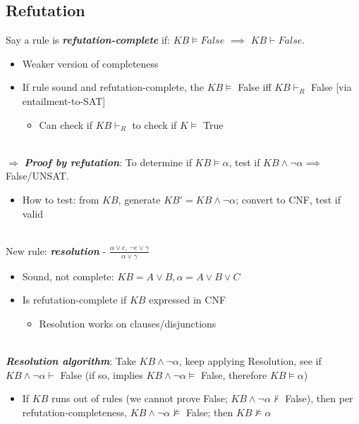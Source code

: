 \documentclass[12pt]{extarticle}
\theoremstyle{definition}
\theoremstyle{remark}
\newcommand{\pstart}[0]{\noindent}
\newcommand{\newp}[0]{~\\ \pstart}
\newcommand{\term}[1]{\noindent\textbf{\textit{#1}}}
\begin{document}
\subsection{Refutation}
Say a rule is \term{refutation-complete} if: $KB\models False$ $\implies$ $KB\vdash False$. \begin{itemize}
    \item Weaker version of completeness
    \item If rule sound and refutation-complete, the $KB\models$ False iff $KB\vdash_R$ False [via entailment-to-SAT] \begin{itemize}
        \item Can check if $KB\vdash_R$ to check if $K\models$ True
    \end{itemize}
\end{itemize}

\newp
$\Rightarrow$ \term{Proof by refutation}: To determine if $KB\models\alpha$, test if $KB\land\neg\alpha\implies$ False/UNSAT.\begin{itemize}
    \item How to test: from $KB$, generate $KB'=KB\land\neg\alpha$; convert to CNF, test if valid
\end{itemize}

\newp
New rule: \term{resolution} - $\frac{\alpha\lor e,\,\neg e\lor\gamma}{\alpha\lor\gamma}$ \begin{itemize}
    \item Sound, not complete: $KB= A\lor B,\alpha=A\lor B\lor C$
    \item Is refutation-complete if $KB$ expressed in CNF \begin{itemize}
        \item Resolution works on clauses/disjunctions
    \end{itemize}
\end{itemize}

\newp
\term{Resolution algorithm}: Take $KB\land\neg\alpha$, keep applying Resolution, see if $KB\land\neg\alpha\vdash$ False (if so, implies $KB\land\neg\alpha\models$ False, therefore $KB\models\alpha$) \begin{itemize}
    \item If $KB$ runs out of rules (we cannot prove False; $KB\land\neg\alpha\not\vdash$ False), then per refutation-completeness, $KB\land\neg\alpha\not\models$ False; then $KB\not\models\alpha$
\end{itemize}
\end{document}
